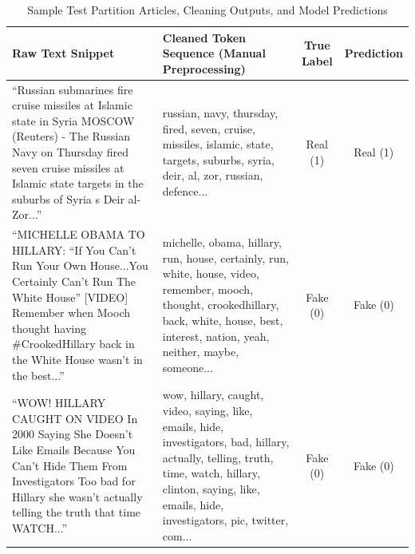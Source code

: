 \documentclass[conference]{IEEEtran}
\begin{document}
\begin{table}[htbp]
\caption{Sample Test Partition Articles, Cleaning Outputs, and Model Predictions}
\label{tab:test_samples}
\begin{center}
\small
\begin{tabular}{p{4.8cm}p{7.0cm}cc}
\toprule
\textbf{Raw Text Snippet} & \textbf{Cleaned Token Sequence (Manual Preprocessing)} & \textbf{True Label} & \textbf{Prediction} \\
\midrule
``Russian submarines fire cruise missiles at Islamic state in Syria MOSCOW (Reuters) - The Russian Navy on Thursday fired seven cruise missiles at Islamic state targets in the suburbs of Syria s Deir al-Zor...'' & russian, navy, thursday, fired, seven, cruise, missiles, islamic, state, targets, suburbs, syria, deir, al, zor, russian, defence... & Real (1) & Real (1) \\
\midrule
``MICHELLE OBAMA TO HILLARY: ``If You Can't Run Your Own House...You Certainly Can't Run The White House'' [VIDEO] Remember when Mooch thought having \#CrookedHillary back in the White House wasn't in the best...'' & michelle, obama, hillary, run, house, certainly, run, white, house, video, remember, mooch, thought, crookedhillary, back, white, house, best, interest, nation, yeah, neither, maybe, someone... & Fake (0) & Fake (0) \\
\midrule
``WOW! HILLARY CAUGHT ON VIDEO In 2000 Saying She Doesn't Like Emails Because You Can't Hide Them From Investigators Too bad for Hillary she wasn't actually telling the truth that time WATCH...'' & wow, hillary, caught, video, saying, like, emails, hide, investigators, bad, hillary, actually, telling, truth, time, watch, hillary, clinton, saying, like, emails, hide, investigators, pic, twitter, com... & Fake (0) & Fake (0) \\
\bottomrule
\end{tabular}
\end{center}
\end{table}
\end{document}
